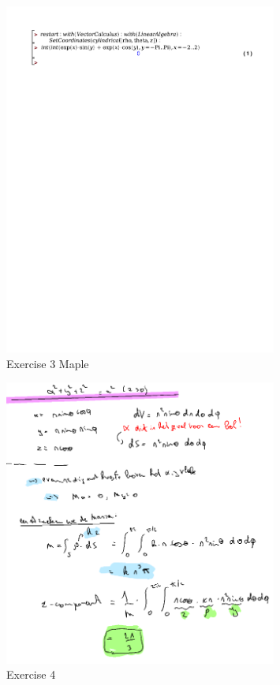 \documentclass[a4paper]{report}
\begin{document}
\begin{figure}[H]
	\centering
  \includegraphics[width=0.8\textwidth]{exercises/huis_7_ex_3.pdf}
	\caption{Exercise 3 Maple}
	\label{fig:huis_7_ex_3}
\end{figure}

\begin{figure}[H]
	\centering
	\includegraphics[width=0.8\textwidth]{assets/huis_7_ex_4.png}
	\caption{Exercise 4}
	\label{fig:huis_7_ex_4}
\end{figure}
\end{document}
